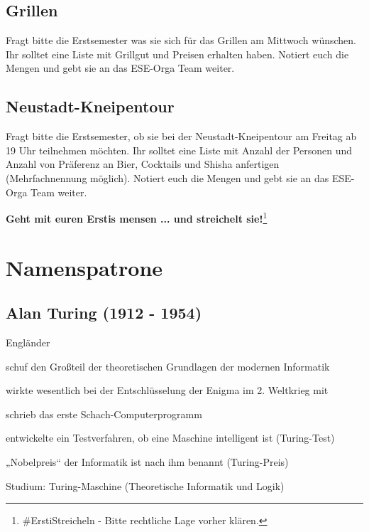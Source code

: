 \documentclass[a4paper,12pt]{report}
\begin{document}
\section{Grillen}
Fragt bitte die Erstsemester was sie sich für das Grillen am Mittwoch wünschen. Ihr solltet eine Liste mit Grillgut und Preisen erhalten haben. Notiert euch die Mengen und gebt sie an das ESE-Orga Team weiter.

\section{Neustadt-Kneipentour}
Fragt bitte die Erstsemester, ob sie bei der Neustadt-Kneipentour am Freitag ab 19 Uhr teilnehmen möchten. Ihr solltet eine Liste mit Anzahl der Personen und Anzahl von Präferenz an Bier, Cocktails und Shisha anfertigen (Mehrfachnennung möglich). Notiert euch die Mengen und gebt sie an das ESE-Orga Team weiter.

\bigskip
\bigskip
\begin{center}
\huge{\textbf{Geht mit euren Erstis mensen ... und streichelt sie!}}\footnote[42]{\#ErstiStreicheln - Bitte rechtliche Lage vorher klären.}
\end{center}
\chapter{Namenspatrone}
\section*{Alan Turing (1912 - 1954)}
\begin{itemize*}
    \item Engländer
    \item schuf den Großteil der theoretischen Grundlagen der modernen Informatik
    \item wirkte wesentlich bei der Entschlüsselung der Enigma im 2. Weltkrieg mit
    \item schrieb das erste Schach-Computerprogramm
    \item entwickelte ein Testverfahren, ob eine Maschine intelligent ist (Turing-Test)
    \item „Nobelpreis“ der Informatik ist nach ihm benannt (Turing-Preis)
    \item Studium: Turing-Maschine (Theoretische Informatik und Logik)
\end{itemize*}
\end{document}
